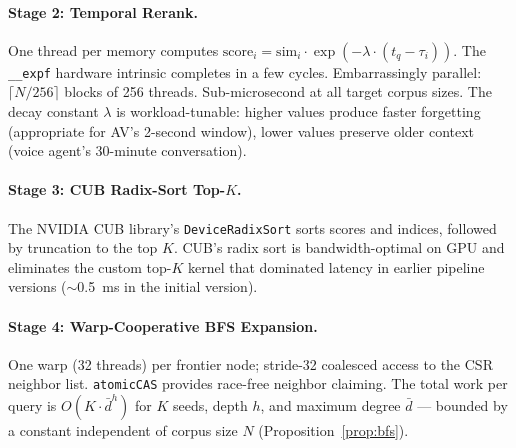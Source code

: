 \documentclass[11pt]{article}
\begin{document}
\paragraph{Stage 2: Temporal Rerank.}
One thread per memory computes
$\text{score}_i = \text{sim}_i \cdot \exp(-\lambda \cdot (t_q - \tau_i))$.
The \texttt{\_\_expf} hardware intrinsic completes in a few cycles.
Embarrassingly parallel: $\lceil N/256 \rceil$ blocks of 256 threads.
Sub-microsecond at all target corpus sizes. The decay constant $\lambda$
is workload-tunable: higher values produce faster forgetting (appropriate
for AV's 2-second window), lower values preserve older context (voice
agent's 30-minute conversation).

\paragraph{Stage 3: CUB Radix-Sort Top-$K$.}
The NVIDIA CUB library's \texttt{DeviceRadixSort} sorts scores and
indices, followed by truncation to the top $K$. CUB's radix sort is
bandwidth-optimal on GPU and eliminates the custom top-$K$ kernel that
dominated latency in earlier pipeline versions ($\sim$0.5~ms in the initial version).

\paragraph{Stage 4: Warp-Cooperative BFS Expansion.}
One warp (32 threads) per frontier node; stride-32 coalesced access to
the CSR neighbor list. \texttt{atomicCAS} provides race-free neighbor
claiming. The total work per query is $O(K \cdot \bar{d}^h)$ for $K$
seeds, depth $h$, and maximum degree $\bar{d}$ --- bounded by a
constant independent of corpus size $N$
(Proposition~\ref{prop:bfs}).
\end{document}
